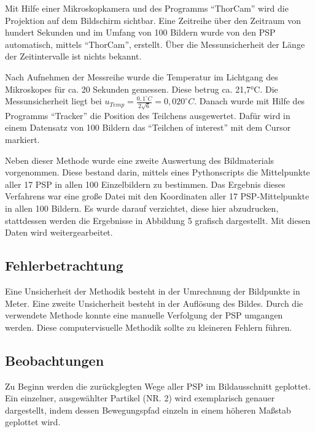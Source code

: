 \documentclass[
  9pt,
]{article}
\begin{document}
Mit Hilfe einer Mikroskopkamera und des Programms ``ThorCam'' wird die
Projektion auf dem Bildschirm sichtbar. Eine Zeitreihe über den Zeitraum
von hundert Sekunden und im Umfang von 100 Bildern wurde von den PSP
automatisch, mittels ``ThorCam'', erstellt. Über die Messunsicherheit
der Länge der Zeitintervalle ist nichts bekannt.

Nach Aufnehmen der Messreihe wurde die Temperatur im Lichtgang des
Mikroskopes für ca. 20 Sekunden gemessen. Diese betrug ca. 21,7°C. Die
Messunsicherheit liegt bei
\(u_{Temp}=\frac{0,1^{\circ}C}{2\sqrt{6}}= 0,020^{\circ}C\). Danach
wurde mit Hilfe des Programms ``Tracker'' die Position des Teilchens
ausgewertet. Dafür wird in einem Datensatz von 100 Bildern das
``Teilchen of interest'' mit dem Cursor markiert.

Neben dieser Methode wurde eine zweite Auswertung des Bildmaterials
vorgenommen. Diese bestand darin, mittels eines Pythonscripts die
Mittelpunkte aller 17 PSP in allen 100 Einzelbildern zu bestimmen. Das
Ergebnis dieses Verfahrens war eine große Datei mit den Koordinaten
aller 17 PSP-Mittelpunkte in allen 100 Bildern. Es wurde darauf
verzichtet, diese hier abzudrucken, stattdessen werden die Ergebnisse in
Abbildung 5 grafisch dargestellt. Mit diesen Daten wird
weitergearbeitet.

\hypertarget{fehlerbetrachtung}{%
\subsection{Fehlerbetrachtung}\label{fehlerbetrachtung}}

Eine Unsicherheit der Methodik besteht in der Umrechnung der Bildpunkte
in Meter. Eine zweite Unsicherheit besteht in der Auflösung des Bildes.
Durch die verwendete Methode konnte eine manuelle Verfolgung der PSP
umgangen werden. Diese computervisuelle Methodik sollte zu kleineren
Fehlern führen.

\hypertarget{beobachtungen}{%
\subsection{Beobachtungen}\label{beobachtungen}}

Zu Beginn werden die zurückglegten Wege aller PSP im Bildausschnitt
geplottet. Ein einzelner, ausgewählter Partikel (NR. 2) wird
exemplarisch genauer dargestellt, indem dessen Bewegungspfad einzeln in
einem höheren Maßstab geplottet wird.
\end{document}
